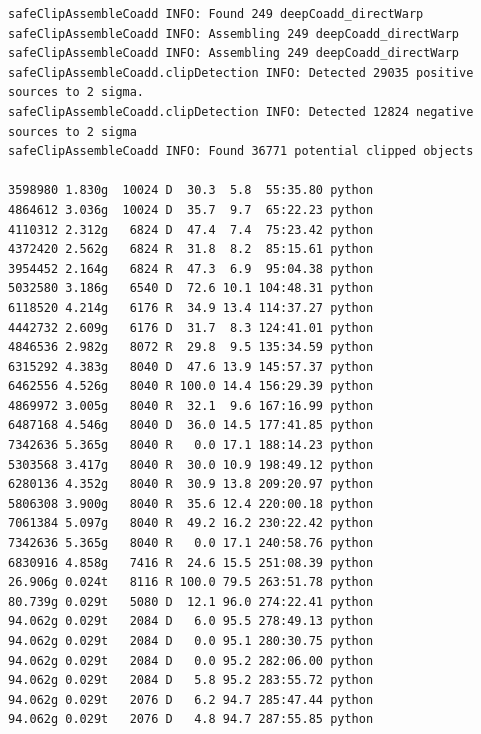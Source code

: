 \documentclass[modern]{aastex61}
\begin{document}
\begin{small}
\begin{verbatim}
safeClipAssembleCoadd INFO: Found 249 deepCoadd_directWarp
safeClipAssembleCoadd INFO: Assembling 249 deepCoadd_directWarp
safeClipAssembleCoadd INFO: Assembling 249 deepCoadd_directWarp
safeClipAssembleCoadd.clipDetection INFO: Detected 29035 positive sources to 2 sigma.
safeClipAssembleCoadd.clipDetection INFO: Detected 12824 negative sources to 2 sigma
safeClipAssembleCoadd INFO: Found 36771 potential clipped objects

3598980 1.830g  10024 D  30.3  5.8  55:35.80 python
4864612 3.036g  10024 D  35.7  9.7  65:22.23 python
4110312 2.312g   6824 D  47.4  7.4  75:23.42 python
4372420 2.562g   6824 R  31.8  8.2  85:15.61 python                                                       
3954452 2.164g   6824 R  47.3  6.9  95:04.38 python                                                       
5032580 3.186g   6540 D  72.6 10.1 104:48.31 python
6118520 4.214g   6176 R  34.9 13.4 114:37.27 python                                                       
4442732 2.609g   6176 D  31.7  8.3 124:41.01 python
4846536 2.982g   8072 R  29.8  9.5 135:34.59 python                                                       
6315292 4.383g   8040 D  47.6 13.9 145:57.37 python
6462556 4.526g   8040 R 100.0 14.4 156:29.39 python                                                       
4869972 3.005g   8040 R  32.1  9.6 167:16.99 python                                                       
6487168 4.546g   8040 D  36.0 14.5 177:41.85 python
7342636 5.365g   8040 R   0.0 17.1 188:14.23 python                                                       
5303568 3.417g   8040 R  30.0 10.9 198:49.12 python                                                       
6280136 4.352g   8040 R  30.9 13.8 209:20.97 python                                                       
5806308 3.900g   8040 R  35.6 12.4 220:00.18 python                                                       
7061384 5.097g   8040 R  49.2 16.2 230:22.42 python                                                       
7342636 5.365g   8040 R   0.0 17.1 240:58.76 python                                                       
6830916 4.858g   7416 R  24.6 15.5 251:08.39 python                                                        
26.906g 0.024t   8116 R 100.0 79.5 263:51.78 python                                                        
80.739g 0.029t   5080 D  12.1 96.0 274:22.41 python
94.062g 0.029t   2084 D   6.0 95.5 278:49.13 python                                                        
94.062g 0.029t   2084 D   0.0 95.1 280:30.75 python                                                        
94.062g 0.029t   2084 D   0.0 95.2 282:06.00 python                                                        
94.062g 0.029t   2084 D   5.8 95.2 283:55.72 python                                                        
94.062g 0.029t   2076 D   6.2 94.7 285:47.44 python                                                        
94.062g 0.029t   2076 D   4.8 94.7 287:55.85 python

\end{verbatim}
\end{small}
\end{document}
